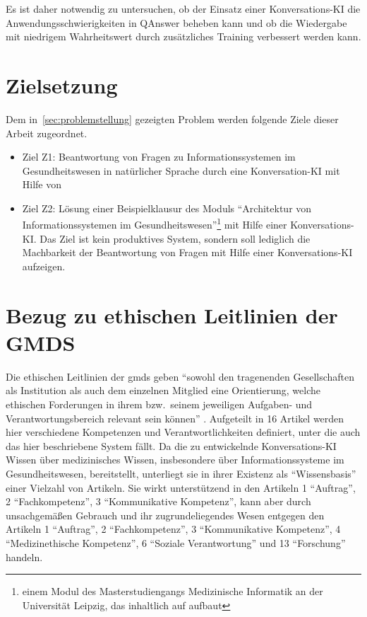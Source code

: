 Es ist daher notwendig zu untersuchen, ob der Einsatz einer Konversations-KI die Anwendungsschwierigkeiten in QAnswer beheben kann und ob die Wiedergabe mit niedrigem Wahrheitswert durch zusätzliches Training verbessert werden kann.

\section{Zielsetzung}\label{sec:zielsetzung}

Dem in~\cref{sec:problemstellung} gezeigten Problem werden folgende Ziele dieser Arbeit zugeordnet.
\begin{itemize}
  \item Ziel Z1: Beantwortung von Fragen zu Informationssystemen im Gesundheitswesen in natürlicher Sprache durch eine Konversation-KI mit Hilfe von \citet{bb}
  \item Ziel Z2: Lösung einer Beispielklausur des Moduls \enquote{Architektur von Informationssystemen im Gesundheitswesen}\footnote{\raggedright{}einem Modul des Masterstudiengangs Medizinische Informatik an der Universität Leipzig, das inhaltlich auf \citet{bb} aufbaut} mit Hilfe einer Konversations-KI.\@
  Das Ziel ist kein produktives System, sondern soll lediglich die Machbarkeit der Beantwortung von Fragen mit Hilfe einer Konversations-KI aufzeigen.
\end{itemize}

\section{Bezug zu ethischen Leitlinien der GMDS}\label{sec:gmds_ethik}

Die ethischen Leitlinien der \ac{gmds} \citep{gmds_eth} geben \enquote{sowohl den tragenenden Gesellschaften als Institution als auch dem einzelnen Mitglied eine Orientierung,
welche ethischen Forderungen in ihrem bzw.\ seinem jeweiligen Aufgaben- und Verantwortungsbereich relevant sein können} \citep{gmds_eth}.
Aufgeteilt in 16 Artikel werden hier verschiedene Kompetenzen und Verantwortlichkeiten definiert, unter die auch das hier beschriebene System fällt.
Da die zu entwickelnde Konversations-KI Wissen über medizinisches Wissen, insbesondere über Informationssysteme im Gesundheitswesen, bereitstellt,
unterliegt sie in ihrer Existenz als \enquote{Wissensbasis} einer Vielzahl von Artikeln.
Sie wirkt unterstützend in den Artikeln 1 \enquote{Auftrag}, 2 \enquote{Fachkompetenz}, 3 \enquote{Kommunikative Kompetenz},
kann aber durch unsachgemäßen Gebrauch und ihr zugrundeliegendes Wesen entgegen den Artikeln 1 \enquote{Auftrag}, 2 \enquote{Fachkompetenz}, 3 \enquote{Kommunikative Kompetenz},
4 \enquote{Medizinethische Kompetenz}, 6 \enquote{Soziale Verantwortung} und 13 \enquote{Forschung} handeln.\\

